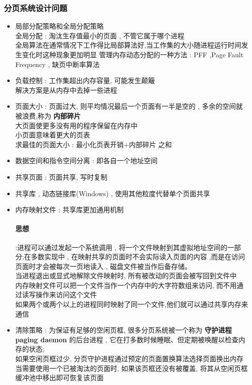 \documentclass[UTF8,a4paper]{ctexart}
\begin{document}
\subsubsection{分页系统设计问题}
\begin{itemize}
	\item 局部分配策略和全局分配策略\\
	      全局分配 : 淘汰生存值最小的页面 , 不管它属于哪个进程\\
	      全局算法在通常情况下工作得比局部算法好,当工作集的大小随进程运行时间发生变化时这种现象更加明显
	      管理内存动态分配的一种方法 : PFF ,Page Fault Frequency , 缺页中断率算法 
	\item 负载控制 : 工作集超出内存容量, 可能发生颠簸\\
	      解决方案是从内存中去掉一些进程
	\item 页面大小 : 页面过大, 则平均情况最后一个页面有一半是空的 , 多余的空间就被浪费,称为 \textbf{内部碎片}\\
	      大页面使更多没有用的程序保留在内存中\\
	      小页面意味着更大的页表\\
	      求最佳的页面大小 : 最小化页表开销+内部碎片 之和
	\item 数据空间和指令空间分离 : 即各自一个地址空间
	\item 共享页面 : 页面共享, 写时复制
	\item 共享库 , 动态链接库(Windows) , 使用其他粒度代替单个页面共享
	\item 内存映射文件 : 共享库更加通用机制
	\paragraph{思想}:进程可以通过发起一个系统调用 , 将一个文件映射到其虚拟地址空间的一部分;在多数实现中 , 在映射共享的页面时不会实际读入页面的内容 ,而是在访问页面时才会被每次一页地读入 , 磁盘文件被当作后备存储。\\
	当进程退出或显式地解除文件映射时,  所有被改动的页面会被写回到文件中\\
	内存映射文件可以把一个文件当作一个内存中的大字符数组来访问, 而不用通过读写操作来访问这个文件\\
	如果两个或两个以上的进程同时映射了同一个文件,他们就可以通过共享内存来通信
	\item 清除策略 : 为保证有足够的空闲页框, 很多分页系统被一个称为 \textbf{守护进程 paging daemon} 的后台进程 , 它在打多数时候睡眠、但定期被唤醒以检查内存的状态;\\
	如果空闲页框过少, 分页守护进程通过预定的页面置换算法选择页面换出内存\\
	当需要使用一个已被淘汰的页面时, 如果该页框还没有被覆盖, 将其从空闲页框缓冲池中移出即可恢复该页面

\end{itemize}
\end{document}
